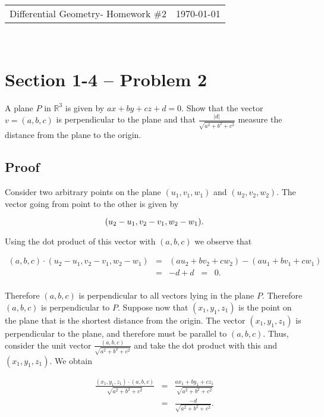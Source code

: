 \documentclass{article}
\newcommand{\leftright}[2]{\begin{tabularx}{\textwidth}{X>{\raggedleft}X}#1%
& #2\\\end{tabularx}\\[-0.5cm]}
\begin{document}
\leftright{Differential Geometry- Homework \#2}{\today} %



\section*{Section 1-4 -- Problem 2}

\noindent A plane $P$ in $\mathbb{R}^3$ is given by $ax + by+ cz + d = 0$.  Show that the vector $v = (a,b,c)$ is perpendicular to the plane and that $\frac{|d|}{\sqrt{a^2 + b^2+c^2}}$ measure the distance from the plane to the origin.

\subsection*{Proof}

\noindent Consider two arbitrary points on the plane $(u_1, v_1, w_1)$ and $(u_2, v_2, w_2)$.  The vector going from point to the other is given by

\begin{equation*}
(u_2 - u_1, v_2-v_1, w_2 - w_1). \\
\end{equation*}

\noindent Using the dot product of this vector with $(a,b,c)$ we observe that 

\begin{eqnarray*}
(a,b,c)\cdot (u_2 - u_1, v_2-v_1 , w_2 - w_1) & = & (au_2 + bv_2 + cw_2) - (au_1 + bv_1 + cw_1) \\
& = & -d + d \;\; = \;\; 0. \\
\end{eqnarray*}

\noindent Therefore $(a,b,c)$ is perpendicular to all vectors lying in the plane $P$.  Therefore $(a,b,c)$ is perpendicular to $P$.  Suppose now that $(x_1, y_1, z_1)$ is the point on the plane that is the shortest distance from the origin.  The vector $(x_1, y_1, z_1)$ is perpendicular to the plane, and therefore must be parallel to $(a,b,c)$.  Thus, consider the unit vector $\frac{(a,b,c)}{\sqrt{a^2+ b^2 + c^2}}$ and take the dot product with this and $(x_1, y_1, z_1)$.  We obtain

\begin{eqnarray*}
\frac{(x_1, y_1, z_1) \cdot  (a,b,c)}{\sqrt{a^2 + b^2+c^2}} & = & \frac{ax_1 + by_1 + cz_1}{\sqrt{a^2 + b^2+c^2}} \\
& = & \frac{-d}{\sqrt{a^2+b^2+c^2}}. \\
\end{eqnarray*}
\end{document}

